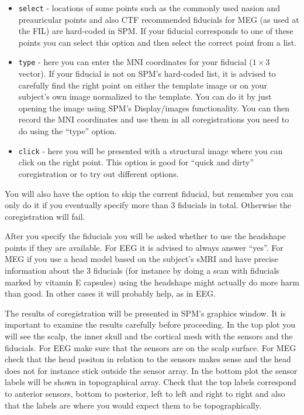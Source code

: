 \begin{itemize}
\item \texttt{select} - locations of some points such as the commonly used nasion and preauricular points and also CTF recommended fiducials for MEG (as used at the FIL) are hard-coded in SPM. If your fiducial corresponds to one of these points you can select this option and then select the correct point from a list.
\item \texttt{type} - here you can enter the MNI coordinates for your fiducial ($1 \times 3$ vector). If your fiducial is not on SPM's hard-coded list, it is advised to carefully find the right point on either the template image or on your subject's own image normalized to the template. You can do it by just opening the image using SPM's Display/images functionality. You can then record the MNI coordinates and use them in all coregistrations you need to do using the ``type'' option.
\item \texttt{click} - here you will be presented with a structural image where you can click on the right point. This option is good for ``quick and dirty'' coregistration or to try out different options.
\end{itemize}

You will also have the option to skip the current fiducial, but remember you can only do it if you eventually specify more than 3 fiducials in total. Otherwise the coregistration will fail.

After you specify the fiducials you will be asked whether to use the headshape points if they are available. For EEG it is advised to always answer ``yes''. For MEG if you use a head model based on the subject's sMRI and have precise information about the 3 fiducials (for instance by doing a scan with fiducials marked by vitamin E capsules) using the headshape might actually do more harm than good. In other cases it will probably help, as in EEG.

The results of coregistration will be presented in SPM's graphics window. It is important to examine the results carefully before proceeding. In the top plot you will see the scalp, the inner skull and the cortical mesh with the sensors and the fiducials. For EEG make sure that the sensors are on the scalp surface. For MEG check that the head positon in relation to the sensors makes sense and the head does not for instance stick outside the sensor array. In the bottom plot the sensor labels will be shown in topographical array. Check that the top labels correspond to anterior sensors, bottom to posterior, left to left and right to right and also that the labels are where you would expect them to be topographically.


